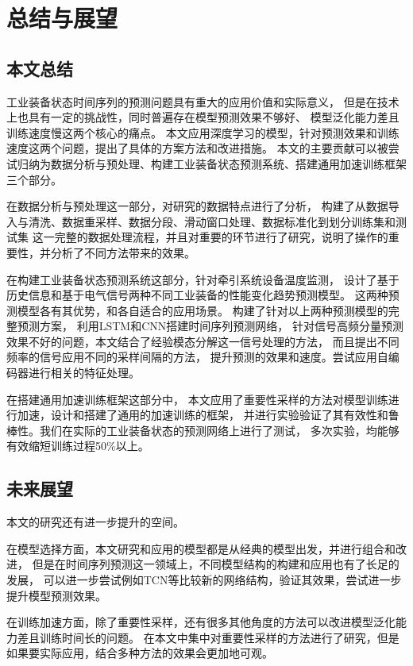 
\chapter{总结与展望}\label{chapter6}


\section{本文总结}
工业装备状态时间序列的预测问题具有重大的应用价值和实际意义，
但是在技术上也具有一定的挑战性，同时普遍存在模型预测效果不够好、
模型泛化能力差且训练速度慢这两个核心的痛点。
本文应用深度学习的模型，针对预测效果和训练速度这两个问题，提出了具体的方案方法和改进措施。
本文的主要贡献可以被尝试归纳为数据分析与预处理、构建工业装备状态预测系统、搭建通用加速训练框架三个部分。

在数据分析与预处理这一部分，对研究的数据特点进行了分析，
构建了从数据导入与清洗、数据重采样、数据分段、滑动窗口处理、数据标准化到划分训练集和测试集
这一完整的数据处理流程，并且对重要的环节进行了研究，说明了操作的重要性，并分析了不同方法带来的效果。

在构建工业装备状态预测系统这部分，针对牵引系统设备温度监测，
设计了基于历史信息和基于电气信号两种不同工业装备的性能变化趋势预测模型。
这两种预测模型各有其优势，和各自适合的应用场景。
构建了针对以上两种预测模型的完整预测方案，
利用LSTM和CNN搭建时间序列预测网络，
针对信号高频分量预测效果不好的问题，本文结合了经验模态分解这一信号处理的方法，
而且提出不同频率的信号应用不同的采样间隔的方法，
提升预测的效果和速度。尝试应用自编码器进行相关的特征处理。

在搭建通用加速训练框架这部分中，
本文应用了重要性采样的方法对模型训练进行加速，设计和搭建了通用的加速训练的框架，
并进行实验验证了其有效性和鲁棒性。我们在实际的工业装备状态的预测网络上进行了测试，
多次实验，均能够有效缩短训练过程50\%以上。

\section{未来展望}

本文的研究还有进一步提升的空间。

在模型选择方面，本文研究和应用的模型都是从经典的模型出发，并进行组合和改进，
但是在时间序列预测这一领域上，不同模型结构的构建和应用也有了长足的发展，
可以进一步尝试例如TCN等比较新的网络结构，验证其效果，尝试进一步提升模型预测效果。

在训练加速方面，除了重要性采样，还有很多其他角度的方法可以改进模型泛化能力差且训练时间长的问题。
在本文中集中对重要性采样的方法进行了研究，但是如果要实际应用，结合多种方法的效果会更加地可观。
